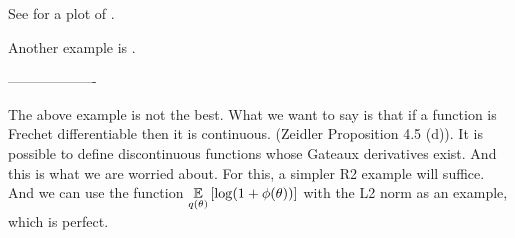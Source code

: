 See  for a plot of .


Another example is \citet[Example 1.9]{averbukh:1967:theory}.


-------------------

The above example is not the best.  What we want to say is that if a function is
Frechet differentiable then it is continuous.  (Zeidler Proposition 4.5 (d)). It
is possible to define discontinuous functions whose Gateaux derivatives exist.
And this is what we are worried about.  For this, a simpler R2 example will
suffice.  And we can use the function $\underset{q(\theta)}{\mathbb{E}}\left[\log(1 +
\phi(\theta))\right]$ with the L2 norm as an example, which is perfect.
